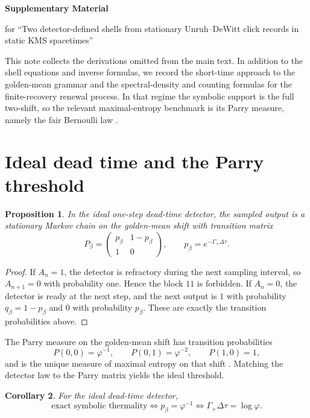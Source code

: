 \documentclass[11pt]{amsart}
\numberwithin{equation}{section}
\newtheorem{proposition}{Proposition}[section]
\newtheorem{corollary}[proposition]{Corollary}
\theoremstyle{remark}
\begin{document}
\begin{center}
{\LARGE\bfseries Supplementary Material}\par
\vspace{0.5em}
{\large for ``Two detector-defined shells from stationary Unruh--DeWitt click records in static KMS spacetimes''}\par
\end{center}

This note collects the derivations omitted from the main text. In addition to the shell equations and inverse formulas, we record the short-time approach to the golden-mean grammar and the spectral-density and counting formulas for the finite-recovery renewal process. In that regime the symbolic support is the full two-shift, so the relevant maximal-entropy benchmark is its Parry measure, namely the fair Bernoulli law \cite{LindMarcus1995}.

\section{Ideal dead time and the Parry threshold}

\begin{proposition}\label{prop:supp-ideal-markov}
In the ideal one-step dead-time detector, the sampled output is a stationary Markov chain on the golden-mean shift with transition matrix
\[
P_\beta=
\begin{pmatrix}
 p_\beta & 1-p_\beta \\
 1 & 0
\end{pmatrix},
\qquad p_\beta=e^{-\Gamma_+\Delta\tau}.
\]
\end{proposition}

\begin{proof}
If $A_n=1$, the detector is refractory during the next sampling interval, so $A_{n+1}=0$ with probability one. Hence the block $11$ is forbidden. If $A_n=0$, the detector is ready at the next step, and the next output is $1$ with probability $q_\beta=1-p_\beta$ and $0$ with probability $p_\beta$. These are exactly the transition probabilities above.
\end{proof}

The Parry measure on the golden-mean shift has transition probabilities
\[
P(0,0)=\varphi^{-1},\qquad P(0,1)=\varphi^{-2},\qquad P(1,0)=1,
\]
and is the unique measure of maximal entropy on that shift \cite{Parry1964,LindMarcus1995}. Matching the detector law to the Parry matrix yields the ideal threshold.

\begin{corollary}\label{cor:supp-parry-threshold}
For the ideal dead-time detector,
\[
\text{exact symbolic thermality}
\iff p_\beta=\varphi^{-1}
\iff \Gamma_+\Delta\tau=\log\varphi.
\]
\end{corollary}
\end{document}
